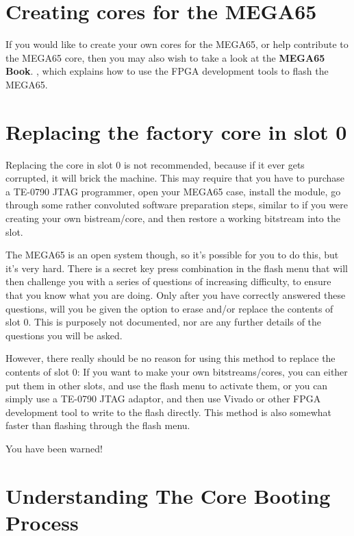\section{Creating cores for the MEGA65}

If you would like to create your own cores for the MEGA65, or help
contribute to the MEGA65 core, then
you may also wish to take a look at
\ifdefined\printmanual
the {\bf MEGA65 Book}.
\else
{},
\fi
which explains how to use the
FPGA development tools to flash the MEGA65.

\section{Replacing the factory core in slot 0}

Replacing the core in slot 0 is not recommended, because if it ever gets corrupted, it will brick the machine.
This may require that you have to purchase a TE-0790 JTAG programmer, open your MEGA65 case, install
the module, go through some rather convoluted software preparation steps, similar to if you were
creating your own bistream/core, and then restore a working bitstream into the slot.

The MEGA65 is an open system though, so it's possible for you to do this, but it's very hard. There
is a secret key press combination in the flash menu that will then challenge you with a series of questions of
increasing difficulty, to ensure that you know what you are doing.  Only after you have correctly
answered these questions, will you be given the option to erase and/or replace the contents of slot 0.
This is purposely not documented, nor are any further details of the questions you will be asked.

However, there really should be no reason for using this method to replace the contents of slot 0:
If you want to make your own bitstreams/cores, you can either put them in other slots, and use the
flash menu to activate them, or you can simply use a TE-0790 JTAG adaptor, and then use
Vivado or other FPGA development tool to write to the flash directly. This method is also
somewhat faster than flashing through the flash menu.

You have been warned!

\section{Understanding The Core Booting Process}

